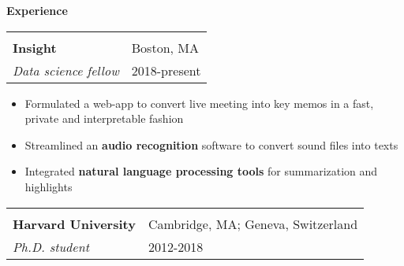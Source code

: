 \documentclass[letterpaper,11pt,oneside]{article}
\newcommand{\crimson}[1]{\textcolor[rgb]{0.67, 0.11, 0.188}{#1}}
\begin{document}
 \vspace{-0.25cm}
 \raggedright
 \textbf{\Large{\crimson{E}xperience}} \sout{\hfill} \\
 \normalsize
\begin{flushleft}
 \vspace{-0.35cm}
 \begin{tabular}{@{} l l }
    \hspace{0.8\linewidth} & \hspace{0.1\linewidth} \\
    \textbf{Insight} & Boston, MA \\ 
    \textit{Data science fellow} & 2018-present \\ 
 \end{tabular}
 \end{flushleft}
 \begin{flushleft}
 \begin{small}
 \begin{itemize}[leftmargin=*]
 \item Formulated a web-app to convert live meeting into key memos in a fast, private and interpretable fashion
 \item Streamlined an \textbf{audio recognition} software to convert sound files into texts
 \item Integrated \textbf{natural language processing tools} for summarization and highlights
 \end{itemize}
 \end{small}
 \end{flushleft}
 \begin{flushleft}
 \vspace{-0.15cm}
 \begin{tabular}{@{} l l }
    \hspace{0.6\linewidth} & \hspace{0.2\linewidth} \\
    \textbf{Harvard University} & Cambridge, MA; Geneva, Switzerland \\ 
    \textit{Ph.D. student} & \hspace{0.195\linewidth} 2012-2018 \\ 
 \end{tabular}
 \end{flushleft}
\end{document}
